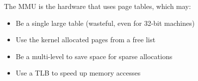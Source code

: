 \begin{slide}


    The MMU is the hardware that uses page tables, which may:

    \begin{itemize}
      \item Be a single large table (wasteful, even for 32-bit machines)
      \item Use the kernel allocated pages from a free list
      \item Be a multi-level to save space for sparse allocations
      \item Use a TLB to speed up memory accesses
    \end{itemize}

\end{slide}
  

